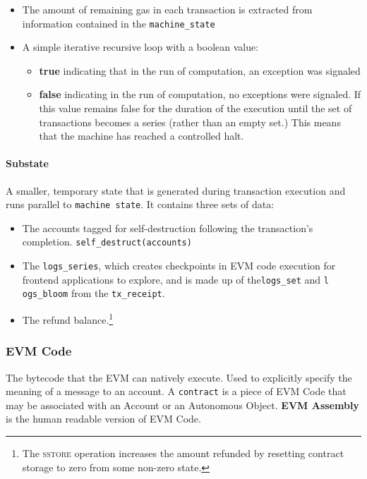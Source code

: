 \documentclass[10pt,letterpaper,leqno,bibliography=totoc]{scrartcl}
\newenvironment{alphafootnotes}
{\par\edef\savedfootnotenumber{\number\value{footnote}}
\renewcommand{\thefootnote}{\alph{footnote}}
\setcounter{footnote}{0}}
{\par\setcounter{footnote}{\savedfootnotenumber}}
\begin{document}
\begin{alphafootnotes}
\begin{multicols*}{2}
		\begin{itemize}
			\item The amount of remaining gas in each transaction is extracted from information contained in the \texttt{machine\_state} 
			\item A simple iterative recursive  loop\supercite{Wood2017} with a boolean  value: 
		\begin{itemize}
				\item\textbf{true} indicating that in the run of computation, an exception was signaled
				\item\textbf{false} indicating in the run of computation, no exceptions were signaled. If this value remains false for the duration of the execution until the set of transactions becomes a series (rather than an empty set.) This means that the machine has reached a controlled halt. 
			\end{itemize}
		\end{itemize}

				\paragraph{Substate}
				
				 A smaller, temporary state that is generated during transaction execution and runs parallel to \texttt{machine state}. It contains three sets of data:
				
				\begin{itemize}
					\item The accounts tagged for self-destruction following the transaction's completion. \texttt{self\_destruct(accounts)}
					\item The \texttt{logs\_series}, which creates checkpoints in EVM code execution for frontend applications to explore, and is made up of the\texttt{logs\_set} and \texttt{l
						ogs\_bloom} from the \texttt{tx\_receipt}.
					\item The refund balance.\footnote{The \textsc{sstore} operation increases the amount refunded by resetting contract storage to zero from some non-zero state.}
				\end{itemize}
				

			\subsubsection{EVM Code}
				The bytecode that the EVM can natively execute. Used to explicitly specify the meaning of a message to an account. A \texttt{contract} is a piece of EVM Code that may be associated with an Account or an Autonomous Object. \textbf{EVM Assembly} is the human readable version of EVM Code.

\end{multicols*}
\end{alphafootnotes}
\end{document}

